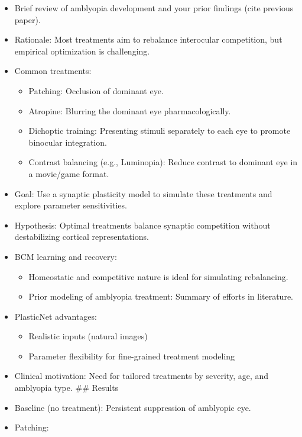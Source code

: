 \documentclass[
]{article}
\providecommand{\tightlist}{%
  \setlength{\itemsep}{0pt}\setlength{\parskip}{0pt}}
\begin{document}
\begin{itemize}
\item[$\square$]
  Brief review of amblyopia development and your prior findings (cite
  previous paper).
\item[$\square$]
  Rationale: Most treatments aim to rebalance interocular competition,
  but empirical optimization is challenging.
\item[$\square$]
  Common treatments:

  \begin{itemize}
  \tightlist
  \item[$\square$]
    Patching: Occlusion of dominant eye.
  \item[$\square$]
    Atropine: Blurring the dominant eye pharmacologically.
  \item[$\square$]
    Dichoptic training: Presenting stimuli separately to each eye to
    promote binocular integration.
  \item[$\square$]
    Contrast balancing (e.g., Luminopia): Reduce contrast to dominant
    eye in a movie/game format.
  \end{itemize}
\item[$\square$]
  Goal: Use a synaptic plasticity model to simulate these treatments and
  explore parameter sensitivities.
\item[$\square$]
  Hypothesis: Optimal treatments balance synaptic competition without
  destabilizing cortical representations.
\item[$\square$]
  BCM learning and recovery:

  \begin{itemize}
  \tightlist
  \item[$\square$]
    Homeostatic and competitive nature is ideal for simulating
    rebalancing.
  \item[$\square$]
    Prior modeling of amblyopia treatment: Summary of efforts in
    literature.
  \end{itemize}
\item[$\square$]
  PlasticNet advantages:

  \begin{itemize}
  \tightlist
  \item[$\square$]
    Realistic inputs (natural images)
  \item[$\square$]
    Parameter flexibility for fine-grained treatment modeling
  \end{itemize}
\item[$\square$]
  Clinical motivation: Need for tailored treatments by severity, age,
  and amblyopia type. \#\# Results
\item[$\square$]
  Baseline (no treatment): Persistent suppression of amblyopic eye.
\item[$\square$]
  Patching:


\end{itemize}
\end{document}
